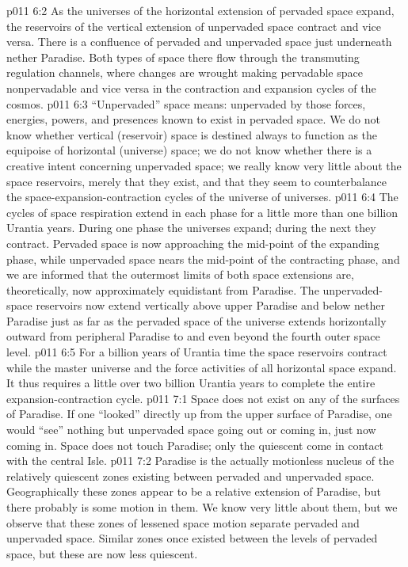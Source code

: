 \vs p011 6:2 As the universes of the horizontal extension of pervaded space expand, the reservoirs of the vertical extension of unpervaded space contract and vice versa. There is a confluence of pervaded and unpervaded space just underneath nether Paradise. Both types of space there flow through the transmuting regulation channels, where changes are wrought making pervadable space nonpervadable and vice versa in the contraction and expansion cycles of the cosmos.
\pc \vs p011 6:3 “Unpervaded” space means: unpervaded by those forces, energies, powers, and presences known to exist in pervaded space. We do not know whether vertical (reservoir) space is destined always to function as the equipoise of horizontal (universe) space; we do not know whether there is a creative intent concerning unpervaded space; we really know very little about the space reservoirs, merely that they exist, and that they seem to counterbalance the space\hyp{}expansion\hyp{}contraction cycles of the universe of universes.
\pc \vs p011 6:4 The cycles of space respiration extend in each phase for a little more than one billion Urantia years. During one phase the universes expand; during the next they contract. Pervaded space is now approaching the mid\hyp{}point of the expanding phase, while unpervaded space nears the mid\hyp{}point of the contracting phase, and we are informed that the outermost limits of both space extensions are, theoretically, now approximately equidistant from Paradise. The unpervaded\hyp{}space reservoirs now extend vertically above upper Paradise and below nether Paradise just as far as the pervaded space of the universe extends horizontally outward from peripheral Paradise to and even beyond the fourth outer space level.
\vs p011 6:5 For a billion years of Urantia time the space reservoirs contract while the master universe and the force activities of all horizontal space expand. It thus requires a little over two billion Urantia years to complete the entire expansion\hyp{}contraction cycle.
\vs p011 7:1 Space does not exist on any of the surfaces of Paradise. If one “looked” directly up from the upper surface of Paradise, one would “see” nothing but unpervaded space going out or coming in, just now coming in. Space does not touch Paradise; only the quiescent  come in contact with the central Isle.
\vs p011 7:2 Paradise is the actually motionless nucleus of the relatively quiescent zones existing between pervaded and unpervaded space. Geographically these zones appear to be a relative extension of Paradise, but there probably is some motion in them. We know very little about them, but we observe that these zones of lessened space motion separate pervaded and unpervaded space. Similar zones once existed between the levels of pervaded space, but these are now less quiescent.
